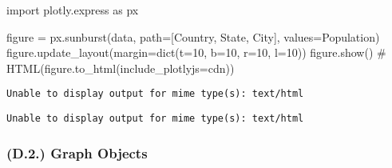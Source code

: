\documentclass[
  letterpaper,
  DIV=11,
  numbers=noendperiod]{scrartcl}
\newenvironment{Shaded}{\begin{snugshade}}{\end{snugshade}}
\newcommand{\BuiltInTok}[1]{\textcolor[rgb]{0.00,0.23,0.31}{#1}}
\newcommand{\CommentTok}[1]{\textcolor[rgb]{0.37,0.37,0.37}{#1}}
\newcommand{\DecValTok}[1]{\textcolor[rgb]{0.68,0.00,0.00}{#1}}
\newcommand{\ImportTok}[1]{\textcolor[rgb]{0.00,0.46,0.62}{#1}}
\newcommand{\NormalTok}[1]{\textcolor[rgb]{0.00,0.23,0.31}{#1}}
\newcommand{\OperatorTok}[1]{\textcolor[rgb]{0.37,0.37,0.37}{#1}}
\newcommand{\StringTok}[1]{\textcolor[rgb]{0.13,0.47,0.30}{#1}}
\begin{document}
\begin{Shaded}
\begin{Highlighting}[]
\ImportTok{import}\NormalTok{ plotly.express }\ImportTok{as}\NormalTok{ px }

\NormalTok{figure }\OperatorTok{=}\NormalTok{ px.sunburst(data, path}\OperatorTok{=}\NormalTok{[}\StringTok{\textquotesingle{}Country\textquotesingle{}}\NormalTok{, }\StringTok{\textquotesingle{}State\textquotesingle{}}\NormalTok{, }\StringTok{\textquotesingle{}City\textquotesingle{}}\NormalTok{], values}\OperatorTok{=}\StringTok{\textquotesingle{}Population\textquotesingle{}}\NormalTok{)}
\NormalTok{figure.update\_layout(margin}\OperatorTok{=}\BuiltInTok{dict}\NormalTok{(t}\OperatorTok{=}\DecValTok{10}\NormalTok{, b}\OperatorTok{=}\DecValTok{10}\NormalTok{, r}\OperatorTok{=}\DecValTok{10}\NormalTok{, l}\OperatorTok{=}\DecValTok{10}\NormalTok{))}
\NormalTok{figure.show() }
\CommentTok{\# HTML(figure.to\_html(include\_plotlyjs=\textquotesingle{}cdn\textquotesingle{}))}
\end{Highlighting}
\end{Shaded}

\begin{verbatim}
Unable to display output for mime type(s): text/html
\end{verbatim}

\begin{verbatim}
Unable to display output for mime type(s): text/html
\end{verbatim}

\hypertarget{d.2.-graph-objects}{%
\subsubsection{(D.2.) Graph Objects}\label{d.2.-graph-objects}}
\end{document}
